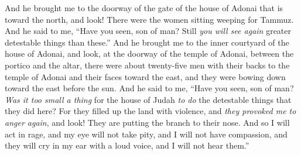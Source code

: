 \begin{biblechapter}
\verse And he brought me to the doorway of the gate of the house of Adonai that is toward the north, and look! There were the women sitting weeping for Tammuz.
\verse And he said to me, “Have you seen, son of man? Still \textit{you will see again} greater detestable things than these.”
\verse And he brought me to the inner courtyard of the house of Adonai, and look, at the doorway of the temple of Adonai, between the portico and the altar, there were about twenty-five men with their backs to the temple of Adonai and their faces toward the east, and they were bowing down toward the east before the sun.
\verse And he said to me, “Have you seen, son of man? \textit{Was it too small a thing} for the house of Judah \textit{to do} the detestable things that they did here? For they filled up the land with violence, and \textit{they provoked me to anger again}, and look! They are putting the branch to their nose.
\verse And so I will act in rage, and my eye will not take pity, and I will not have compassion, and they will cry in my ear with a loud voice, and I will not hear them.”
\end{biblechapter}

